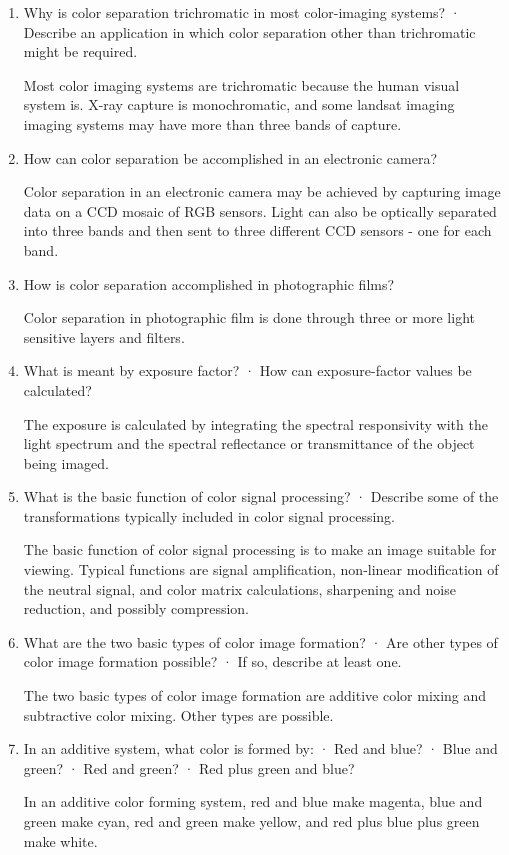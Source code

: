 \begin{enumerate}
 \item
 Why is color separation trichromatic in most color-imaging systems? · Describe an application in which color separation other than trichromatic might be required.
 \par Most color imaging systems are trichromatic because the human visual system is.  X-ray capture is monochromatic, and some landsat imaging imaging systems may have more than three bands of capture.
 \item
 How can color separation be accomplished in an electronic camera?
 \par Color separation in an electronic camera may be achieved by capturing image data on a CCD mosaic of RGB sensors.  Light can also be optically separated into three bands and then sent to three different CCD sensors - one for each band.
 \item
 How is color separation accomplished in photographic films?
 \par Color separation in photographic film is done through three or more light sensitive layers and filters.
 \item
 What is meant by exposure factor? · How can exposure-factor values be calculated?
 \par The exposure is calculated by integrating the spectral responsivity with the light spectrum and the spectral reflectance or transmittance of the object being imaged.
 \item
 What is the basic function of color signal processing? · Describe some of the transformations typically included in color signal processing.
 \par The basic function of color signal processing is to make an image suitable for viewing.  Typical functions are signal amplification, non-linear modification of the neutral signal, and color matrix calculations, sharpening and noise reduction, and possibly compression.
 \item
 What are the two basic types of color image formation? · Are other types of color image formation possible? · If so, describe at least one.
 \par The two basic types of color image formation are additive color mixing and subtractive color mixing.  Other types are possible.
 \item
 In an additive system, what color is formed by: · Red and blue? · Blue and green? · Red and green? · Red plus green and blue?
 \par In an additive color forming system, red and blue make magenta, blue and green make cyan, red and green make yellow, and red plus blue plus green make white.

\end{enumerate}
